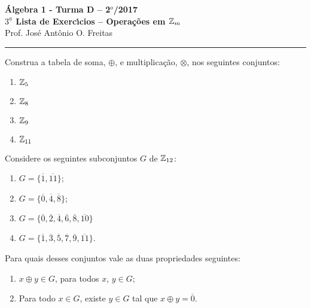 \documentclass[12pt]{article}
\begin{document}


\begin{center}
{\Large\bf {\'A}lgebra 1 - Turma D -- 2$^{o}$/2017} \\ \vspace{9pt} {\large\bf
  $3^{\underline{a}}$ Lista de Exerc{\'\i}cios -- Operações em $\mathbb{Z}_m$}\\
\vspace{9pt} Prof. Jos{\'e} Ant{\^o}nio O. Freitas
\end{center}
\hrule

\vspace{.6cm}

\questao Construa a tabela de soma, $\oplus$, e multiplicação, $\otimes$, nos seguintes conjuntos:
\begin{multicols}{2}
	\begin{enumerate}[label=({\alph*})]
		\item $\mathbb{Z}_5$
		\item $\mathbb{Z}_8$
		\item $\mathbb{Z}_9$
		\item $\mathbb{Z}_{11}$
	\end{enumerate}
\end{multicols}

\vesp

\questao Considere os seguintes subconjuntos $G$ de $\mathbb{Z}_{12}$:
\begin{multicols}{2}
	\begin{enumerate}[label=({\alph*})]
		\item $G=\{\overline{1},\overline{11}\}$;

		\item $G=\{\overline{0},\overline{4},\overline{8}\}$;

		\item $G=\{\overline{0},\overline{2},\overline{4},\overline{6},\overline{8},\overline{10}\}$
		\item $G=\{\overline{1}, \overline{3},\overline{5},\overline{7},\overline{9},\overline{11}\}$.
	\end{enumerate}
\end{multicols}

Para quais desses conjuntos vale as duas propriedades seguintes:
\begin{enumerate}[label=({\roman*})]
	\item $x \oplus y \in G$, para todos $x$, $y \in G$;
	\item Para todo $x \in G$, existe $y \in G$ tal que $x \oplus y = \overline{0}$.
\end{enumerate}
\end{document}
